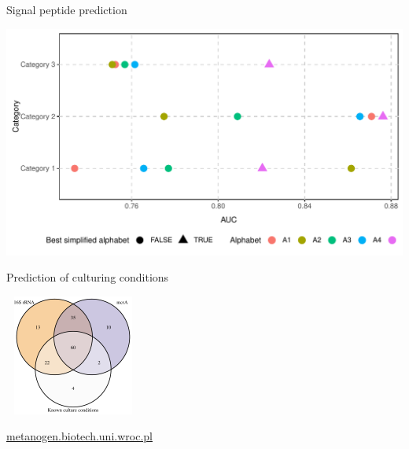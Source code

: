 \documentclass{beamer}\usepackage[]{graphicx}\usepackage[]{color}
\makeatletter
\def\maxwidth{ %
  \ifdim\Gin@nat@width>\linewidth
    \linewidth
  \else
    \Gin@nat@width
  \fi
}
\newenvironment{knitrout}{}{} %
\makeatother
\begin{document}
\begin{frame}{Signal peptide prediction}

\begin{knitrout}
\color{fgcolor}

{\centering \includegraphics[width=\maxwidth]{figure/unnamed-chunk-20-1} 

}



\end{knitrout}
\end{frame}

\begin{frame}{Prediction of culturing conditions}
\begin{knitrout}
\color{fgcolor}

{\centering \includegraphics[width=170,height=150]{figure/unnamed-chunk-21-1} 

}



\end{knitrout}
\url{metanogen.biotech.uni.wroc.pl}~\citep{jablonski2015methanogenic}

\end{frame}
\end{document}
